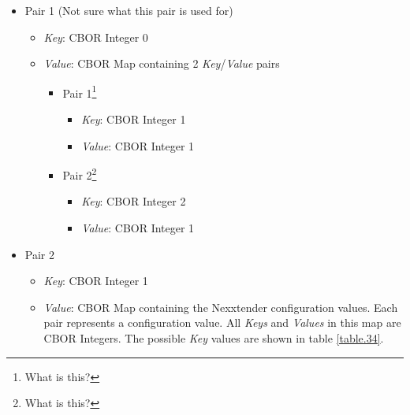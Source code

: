 \documentclass[a4paper]{article}
\begin{document}
\begin{itemize}
	
	\item
	      Pair 1 (Not sure what this pair is used for)
	      
	      \begin{itemize}
	      	  
	      	\item
	      	      \emph{Key}: CBOR Integer 0
	      	\item
	      	      \emph{Value}: CBOR Map containing 2 \emph{Key}/\emph{Value} pairs
	      	      
	      	      \begin{itemize}
	      	      	    
	      	      	\item
	      	      	      Pair 1\footnote{What is this?}
	      	      	      
	      	      	      \begin{itemize}
	      	      	      	      
	      	      	      	\item
	      	      	      	      \emph{Key}: CBOR Integer 1
	      	      	      	\item
	      	      	      	      \emph{Value}: CBOR Integer 1
	      	      	      \end{itemize}
	      	      	\item
	      	      	      Pair 2\footnote{What is this?}
	      	      	      
	      	      	      \begin{itemize}
	      	      	      	      
	      	      	      	\item
	      	      	      	      \emph{Key}: CBOR Integer 2
	      	      	      	\item
	      	      	      	      \emph{Value}: CBOR Integer 1
	      	      	      \end{itemize}
	      	      \end{itemize}
	      \end{itemize}
	\item
	      Pair 2
	      
	      \begin{itemize}
	      	  
	      	\item
	      	      \emph{Key}: CBOR Integer 1
	      	\item
	      	      \emph{Value}: CBOR Map containing the Nexxtender configuration values. 
	               Each pair represents a configuration value. 
	               All \emph{Keys} and \emph{Values} in this map are CBOR Integers. 
	               The possible \emph{Key} values are shown in table \ref{table.34}.
	      \end{itemize}
\end{itemize}
\end{document}
